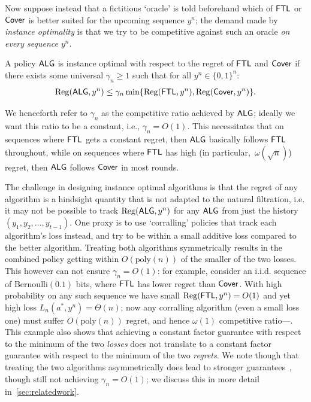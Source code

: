 Now suppose instead that a fictitious `oracle' is told beforehand which of $\mathsf{FTL}$ or $\mathsf{Cover}$ is better suited for the upcoming sequence $y^n$; the demand made by \emph{instance optimality} is that we try to be competitive against such an oracle \emph{on every sequence $y^n$}.
\begin{definition}\label{def:instanceopt_binary}
A policy $\mathsf{ALG}$ is instance optimal with respect to the regret of $\mathsf{FTL}$ and $\mathsf{Cover}$ if there exists some universal $\gamma_n \geq 1$ such that for all $y^n \in \{0,1\}^n$:
\begin{align}
\mathrm{Reg}(\mathsf{ALG},y^n)
\leq \gamma_n \min\{\mathrm{Reg}(\mathsf{FTL},y^n),\mathrm{Reg}(\mathsf{Cover},y^n)\}.
\label{eq:instanceopt_binary}
\end{align}
\end{definition}
We henceforth refer to $\gamma_n$ as the competitive ratio achieved by $\mathsf{ALG}$; ideally we want this ratio to be a constant, i.e., $\gamma_n = O(1)$. 
This necessitates that on sequences where $\mathsf{FTL}$ gets a constant regret, then $\mathsf{ALG}$ basically follows $\mathsf{FTL}$ throughout, while on sequences where $\mathsf{FTL}$ has high (in particular,~$\omega(\sqrt{n})$) regret, then $\mathsf{ALG}$ follows $\mathsf{Cover}$ in most rounds. 


The challenge in designing instance optimal algorithms is that the regret of any algorithm is a hindsight quantity that is not adapted to the natural filtration, i.e. it may not be possible to track $\mathrm{Reg}(\mathsf{ALG},y^n)$ for any $\mathsf{ALG}$ from just the history $(y_1,y_2,\ldots,y_{t-1})$. 
One proxy is to use `corralling' policies that track each algorithm's loss instead, and try to be within a small additive loss compared to the better algorithm.
Treating both algorithms symmetrically results in the combined policy getting within  $O(\text{poly}(n))$ of the smaller of the two losses. This however can not ensure $\gamma_n=O(1)$:
for example, consider an i.i.d. sequence of Bernoulli$(0.1)$ bits, where $\mathsf{FTL}$ has lower regret than $\mathsf{Cover}$. With high probability on any such sequence we have small $\mathrm{Reg}(\mathsf{FTL},y^n)=O(1)$ and yet high loss $L_n(a^*,y^n)=\Theta(n)$; now any corralling algorithm (even a small loss one) must suffer $O(\text{poly}(n))$ regret, and hence $\omega(1)$ competitive ratio---. This example also shows that achieving a constant factor guarantee with respect to the minimum of the two \emph{losses} does not translate to a constant factor guarantee with respect to the minimum of the two \emph{regrets}. We note though that treating the two algorithms asymmetrically does lead to stronger guarantees~\cite{sani2014exploiting}, though still not achieving $\gamma_n=O(1)$; we discuss this in more detail in~\cref{sec:relatedwork}.



